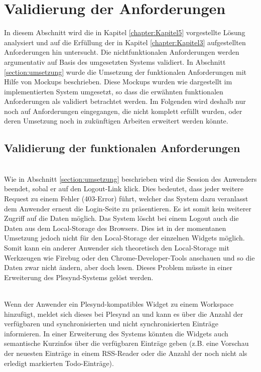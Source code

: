 \section{Validierung der Anforderungen}\label{section:validierung_der_anforderungen}
In diesem Abschnitt wird die in Kapitel \ref{chapter:Kapitel5} vorgestellte Lösung analysiert und auf die Erfüllung der in Kapitel \ref{chapter:Kapitel3} aufgestellten Anforderungen hin untersucht. Die nichtfunktionalen Anforderungen werden argumentativ auf Basis des umgesetzten Systems validiert. In Abschnitt \ref{section:umsetzung} wurde die Umsetzung der funktionalen Anforderungen mit Hilfe von Mockups beschrieben. Diese Mockups wurden wie dargestellt im implementierten System umgesetzt, so dass die erwähnten funktionalen Anforderungen als validiert betrachtet werden. Im Folgenden wird deshalb nur noch auf Anforderungen eingegangen, die nicht komplett erfüllt wurden, oder deren Umsetzung noch in zukünftigen Arbeiten erweitert werden könnte.

\subsection{Validierung der funktionalen Anforderungen}\label{section:funktionale_anforderungen_validierung}
\textbullet{}  \emph{\requirementKeinZugriffNachLogout}\\
Wie in Abschnitt \ref{section:umsetzung} beschrieben wird die Session des Anwenders beendet, sobal er auf den Logout-Link klick. Dies bedeutet, dass jeder weitere Request zu einem Fehler (403-Error) führt, welcher das System dazu veranlasst dem Anwender erneut die Login-Seite zu präsentieren. Es ist somit kein weiterer Zugriff auf die Daten möglich. Das System löscht bei einem Logout auch die Daten aus dem Local-Storage des Browsers. Dies ist in der momentanen Umsetzung jedoch nicht für den Local-Storage der einzelnen Widgets möglich. Somit kann ein anderer Anwender sich theoretisch den Local-Storage mit Werkzeugen wie Firebug oder den Chrome-Developer-Tools anschauen und so die Daten zwar nicht ändern, aber doch lesen. Dieses Problem müsste in einer Erweiterung des Plesynd-Systems gelöst werden.

\textbullet{}  \emph{\requirementWidgetInformSystem}\\
Wenn der Anwender ein Plesynd-kompatibles Widget zu einem Workspace hinzufügt, meldet sich dieses bei Plesynd an und kann es über die Anzahl der verfügbaren und synchronisierten und nicht synchronisierten Einträge informieren. In einer Erweiterung des Systems könnten die Widgets auch semantische Kurzinfos über die verfügbaren Einträge geben (z.B. eine Vorschau der neuesten Einträge in einem \ac{RSS}-Reader oder die Anzahl der noch nicht als erledigt markierten Todo-Einträge).

